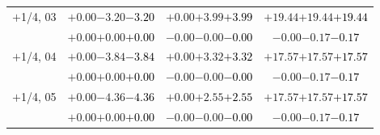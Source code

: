 \documentclass[compress]{beamer}
\begin{document}
\begin{frame}
\begin{tabular}{r | c | c | c}
$+$1/4, 03 & $+0.00$\hspace{0.1 cm}$-3.20$\hspace{0.1 cm}\textcolor{black}{$-3.20$} & $+0.00$\hspace{0.1 cm}$+3.99$\hspace{0.1 cm}\textcolor{black}{$+3.99$} & $+19.44$\hspace{0.1 cm}$+19.44$\hspace{0.1 cm}\textcolor{black}{$+19.44$} \\
           & $+0.00$\hspace{0.1 cm}$+0.00$\hspace{0.1 cm}\textcolor{black}{$+0.00$} & $-0.00$\hspace{0.1 cm}$-0.00$\hspace{0.1 cm}\textcolor{black}{$-0.00$} & $-0.00$\hspace{0.1 cm}$-0.17$\hspace{0.1 cm}\textcolor{black}{$-0.17$} \\
$+$1/4, 04 & $+0.00$\hspace{0.1 cm}$-3.84$\hspace{0.1 cm}\textcolor{black}{$-3.84$} & $+0.00$\hspace{0.1 cm}$+3.32$\hspace{0.1 cm}\textcolor{black}{$+3.32$} & $+17.57$\hspace{0.1 cm}$+17.57$\hspace{0.1 cm}\textcolor{black}{$+17.57$} \\
           & $+0.00$\hspace{0.1 cm}$+0.00$\hspace{0.1 cm}\textcolor{black}{$+0.00$} & $-0.00$\hspace{0.1 cm}$-0.00$\hspace{0.1 cm}\textcolor{black}{$-0.00$} & $-0.00$\hspace{0.1 cm}$-0.17$\hspace{0.1 cm}\textcolor{black}{$-0.17$} \\
$+$1/4, 05 & $+0.00$\hspace{0.1 cm}$-4.36$\hspace{0.1 cm}\textcolor{black}{$-4.36$} & $+0.00$\hspace{0.1 cm}$+2.55$\hspace{0.1 cm}\textcolor{black}{$+2.55$} & $+17.57$\hspace{0.1 cm}$+17.57$\hspace{0.1 cm}\textcolor{black}{$+17.57$} \\
           & $+0.00$\hspace{0.1 cm}$+0.00$\hspace{0.1 cm}\textcolor{black}{$+0.00$} & $-0.00$\hspace{0.1 cm}$-0.00$\hspace{0.1 cm}\textcolor{black}{$-0.00$} & $-0.00$\hspace{0.1 cm}$-0.17$\hspace{0.1 cm}\textcolor{black}{$-0.17$} \\

\end{tabular}
\end{frame}
\end{document}
